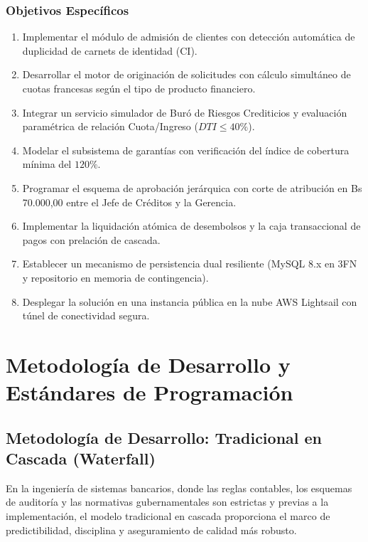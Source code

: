 \documentclass[11pt,letterpaper]{report}
\begin{document}
\subsection{Objetivos Específicos}
\begin{enumerate}[label=\alph*)]
    \item Implementar el módulo de admisión de clientes con detección automática de duplicidad de carnets de identidad (CI).
    \item Desarrollar el motor de originación de solicitudes con cálculo simultáneo de cuotas francesas según el tipo de producto financiero.
    \item Integrar un servicio simulador de Buró de Riesgos Crediticios y evaluación paramétrica de relación Cuota/Ingreso ($DTI \le 40\%$).
    \item Modelar el subsistema de garantías con verificación del índice de cobertura mínima del $120\%$.
    \item Programar el esquema de aprobación jerárquica con corte de atribución en Bs 70.000,00 entre el Jefe de Créditos y la Gerencia.
    \item Implementar la liquidación atómica de desembolsos y la caja transaccional de pagos con prelación de cascada.
    \item Establecer un mecanismo de persistencia dual resiliente (MySQL 8.x en 3FN y repositorio en memoria de contingencia).
    \item Desplegar la solución en una instancia pública en la nube AWS Lightsail con túnel de conectividad segura.
\end{enumerate}

\chapter{Metodología de Desarrollo y Estándares de Programación}

\section{Metodología de Desarrollo: Tradicional en Cascada (Waterfall)}
En la ingeniería de sistemas bancarios, donde las reglas contables, los esquemas de auditoría y las normativas gubernamentales son estrictas y previas a la implementación, el modelo tradicional en cascada proporciona el marco de predictibilidad, disciplina y aseguramiento de calidad más robusto.
\end{document}
